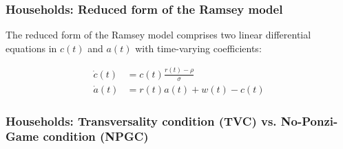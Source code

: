 \subsubsection{Households: Reduced form of the Ramsey model}
The reduced form of the Ramsey model comprises two linear differential equations in \(c(t)\) and \(a(t)\) with time-varying coefficients:

\begin{align}
    \dot{c}(t) &= c(t) \frac{r(t) - \rho}{\sigma} \label{eq:c_dot} \\
    \dot{a}(t) &= r(t)a(t) + w(t) - c(t) \label{eq:a_dot}
\end{align}





\subsubsection{Households: Transversality condition (TVC) vs. No-Ponzi-Game condition (NPGC)}


